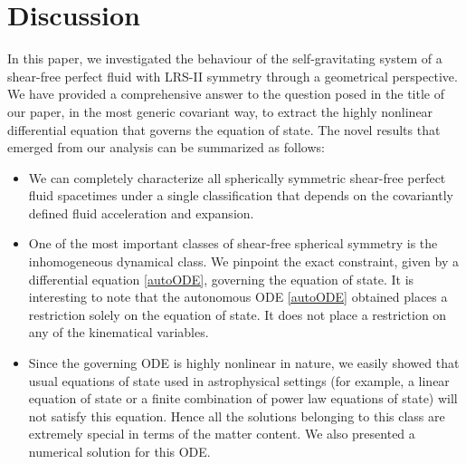 \documentclass[abstract=on,notitlepage,superscriptaddress,nofootinbib,aps,showpacs,twocolumn,prd]{revtex4}
\newcommand{\0}{^{(0)}}
\newcommand{\1}{^{(1)}}
\newcommand{\2}{^{(2)}}
\newcommand{\3}{{}^{(3)}}
\begin{document}


\section{Discussion}
In this paper, we investigated the behaviour of the self-gravitating system of a shear-free perfect fluid with LRS-II symmetry through a geometrical perspective. We have provided a comprehensive answer to the question posed in the title of our paper, in the most generic covariant way, to extract the highly nonlinear differential equation that governs the equation of state. The novel results that emerged from our analysis can be summarized as follows:
\begin{itemize}
\item We can completely characterize all spherically symmetric shear-free perfect fluid spacetimes under a single classification that depends on the covariantly defined fluid acceleration and expansion.
\item One of the most important classes of shear-free spherical symmetry is the inhomogeneous dynamical class. We  pinpoint the exact constraint, given by a differential equation \eqref{autoODE}, governing the equation of state. It is interesting to note that the autonomous ODE \eqref{autoODE} obtained places a restriction solely on the equation of state. It does not place a restriction on any of the kinematical variables.  
\item Since the governing ODE is highly nonlinear in nature, we easily showed that usual equations of state used in astrophysical settings (for example, a linear equation of state or a finite combination of power law equations of state) will not satisfy this equation. Hence all the solutions belonging to this class are extremely special in terms of the matter content. We also presented a numerical solution for this ODE.
\end{itemize}



\end{document}
